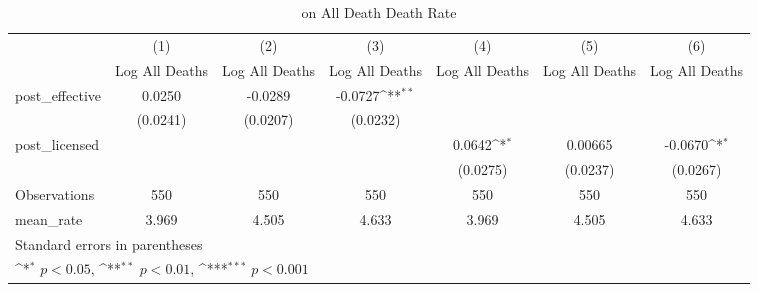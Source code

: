 \begin{table}[htbp]\centering
\def\sym#1{\ifmmode^{#1}\else\(^{#1}\)\fi}
\caption{ on All Death Death Rate}
\begin{tabular}{l*{6}{c}}
\hline\hline
                    &\multicolumn{1}{c}{(1)}&\multicolumn{1}{c}{(2)}&\multicolumn{1}{c}{(3)}&\multicolumn{1}{c}{(4)}&\multicolumn{1}{c}{(5)}&\multicolumn{1}{c}{(6)}\\
                    &\multicolumn{1}{c}{Log All Deaths}&\multicolumn{1}{c}{Log All Deaths}&\multicolumn{1}{c}{Log All Deaths}&\multicolumn{1}{c}{Log All Deaths}&\multicolumn{1}{c}{Log All Deaths}&\multicolumn{1}{c}{Log All Deaths}\\
\hline
post\_effective      &      0.0250         &     -0.0289         &     -0.0727\sym{**} &                     &                     &                     \\
                    &    (0.0241)         &    (0.0207)         &    (0.0232)         &                     &                     &                     \\
[1em]
post\_licensed       &                     &                     &                     &      0.0642\sym{*}  &     0.00665         &     -0.0670\sym{*}  \\
                    &                     &                     &                     &    (0.0275)         &    (0.0237)         &    (0.0267)         \\
\hline
Observations        &         550         &         550         &         550         &         550         &         550         &         550         \\
mean\_rate           &       3.969         &       4.505         &       4.633         &       3.969         &       4.505         &       4.633         \\
\hline\hline
\multicolumn{7}{l}{\footnotesize Standard errors in parentheses}\\
\multicolumn{7}{l}{\footnotesize \sym{*} \(p<0.05\), \sym{**} \(p<0.01\), \sym{***} \(p<0.001\)}\\
\end{tabular}
\end{table}
